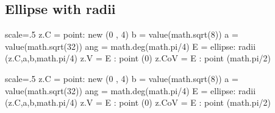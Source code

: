 \subsection{Ellipse with radii} %
\label{sub:ellipse_with_radii}
\begin{minipage}{.5\textwidth}
\begin{tkzexample}[latex=0cm,small,code only]
\begin{tkzelements}
scale=.5
z.C    = point: new (0 , 4)
b      = value(math.sqrt(8))
a      = value(math.sqrt(32))
ang    = math.deg(math.pi/4)
E      = ellipse: radii (z.C,a,b,math.pi/4)
z.V    = E : point (0)
z.CoV  = E : point (math.pi/2)
\end{tkzelements}  
\end{tkzexample}
\end{minipage}
\begin{minipage}{.5\textwidth}
\begin{tkzelements}
scale=.5
z.C    = point: new (0 , 4)
b      = value(math.sqrt(8))
a      = value(math.sqrt(32))
ang    = math.deg(math.pi/4)
E      = ellipse: radii (z.C,a,b,math.pi/4)
z.V    = E : point (0)
z.CoV  = E : point (math.pi/2)
\end{tkzelements}  

\hspace*{\fill}
\end{minipage}

